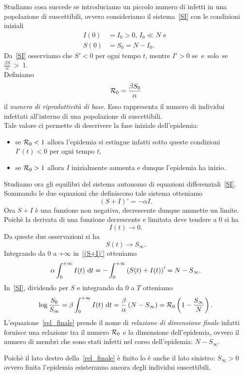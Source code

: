 Studiamo cosa succede se introduciamo un piccolo numero di infetti in una popolazione di suscettibili, ovvero consideriamo il sistema~\eqref{SI} con le condizioni iniziali
\begin{equation*}
\begin{aligned}
  I(0)&=I_0>0 ,\, I_0 \ll N \text{ e } \\
  S(0)&=S_0= N-I_0.
\end{aligned}
\end{equation*}
Da~\eqref{SI} osserviamo che $S'<0$ per ogni tempo $t$,  mentre $I'>0$ se~e~solo~se~$\frac{\beta S }{\alpha}~>~1 $.\\
Definiamo  
$$ \mathcal R_0  = \frac{\beta S_0 }{\alpha}$$ 
il \textit{ numero  di riproduttivit\`a di base}. Esso  rappresenta il numero di individui infettati all'interno di una popolazione di suscettibili.\\
Tale valore ci permette di descrivere la fase iniziale dell'epidemia:
\begin{itemize}
	\item se $\mathcal R_0<1$ allora l'epidemia si estingue infatti sotto queste condizioni $I'(t)<0$ per ogni tempo $t$,
	\item se $\mathcal R_0>1$ allora $I$ inizialmente aumenta e dunque l'epidemia ha inizio.
\end{itemize}
Studiamo ora  gli equilibri del sistema autonomo di equazioni differenziali~\eqref{SI}.\\
Sommando le due equazioni  che definiscono tale  sistema otteniamo 
\begin{equation}
	\label{(S+I)'}(S+I)' = -\alpha I.
\end{equation}
Ora $S+I$ \`e una funzione non negativa, decrescente dunque ammette un limite.\\
Poich\`e la derivata di una funzione decrescente e limitata deve tendere a $0$ si ha $$I(t)\to 0.$$
Da queste due osservazioni si ha $$S(t) \to S_\infty. $$ 
Integrando  da $0$ a $+\infty$ in~\eqref{(S+I)'} otteniamo 
$$ \alpha \int_0^{+\infty} I(t) \,\,\mathrm{d} t = -\int_0^{+\infty} \left(  S(t) + I(t) \right)' = N -S_\infty.$$ 
In~\eqref{SI}, dividendo per $S$ e integrando da $0$ a $T$ otteniamo 
\begin{equation}\label{rel_finale} \log \frac{S_0}{S_\infty} = \beta \int_0^{+\infty} I(t) \,\,\mathrm{d} t =  \frac{\beta}{\alpha} \left(  N - S_\infty  \right)= \mathcal R_0 \left(  1 - \frac{S_\infty}{N} \right).
\end{equation}
L'equazione~\eqref{rel_finale} prende il nome di \textit{relazione di dimensione finale} infatti fornisce una relazione tra il numero $\mathcal R_0$ e la dimensione dell'epidemia,  ovvero il numero di membri che sono stati infetti nel corso dell'epidemia: $ N-S_\infty$.
\begin{oss}
Poich\`e il lato destro della~\eqref{rel_finale} \`e finito lo \`e anche il lato sinistro:  $S_\infty >0$ ovvero finita l'epidemia esisteranno ancora degli individui suscettibili.	
\end{oss}


